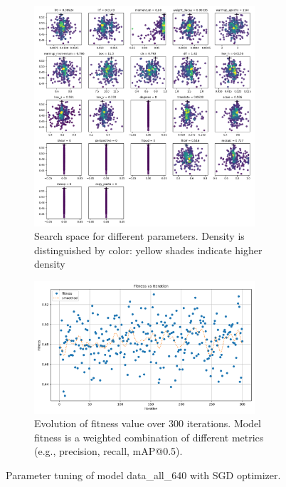 \documentclass[Master,MDS,english]{BASE/twbook} %
\begin{document}
\begin{figure}
\centering
\begin{subfigure}[t]{.5\textwidth}
  \centering
  \includegraphics[width=0.9\textwidth]{images/yolo/all/sgd/tune_scatter_plots}
  \caption{Search space for different parameters. Density is distinguished by color: yellow shades indicate higher density}
\end{subfigure}%
\begin{subfigure}[t]{.5\textwidth}
  \centering
  \includegraphics[width=0.9\textwidth]{images/yolo/all/sgd/tune_fitness}
  \caption{Evolution of fitness value over 300 iterations. Model fitness is a weighted combination of different metrics (e.g., precision, recall, mAP@0.5).}
  \label{fig:images_from_videos}
\end{subfigure}
\caption{Parameter tuning of model data\_all\_640 with SGD optimizer. \\ }
\label{fig:yolo_tune_all_sgd}
\end{figure}

\end{document}
